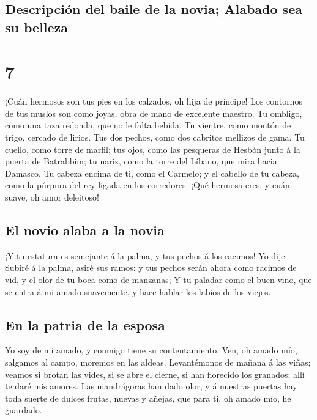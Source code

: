 \hypertarget{descripciuxf3n-del-baile-de-la-novia-alabado-sea-su-belleza}{%
\subsection{Descripción del baile de la novia; Alabado sea su
belleza}\label{descripciuxf3n-del-baile-de-la-novia-alabado-sea-su-belleza}}

\hypertarget{section-22-7}{%
\section{7}\label{section-22-7}}

 ¡Cuán hermosos son tus pies en los calzados, oh hija de
príncipe! Los contornos de tus muslos son como joyas, obra de mano de
excelente maestro.  Tu ombligo, como una taza redonda, que
no le falta bebida. Tu vientre, como montón de trigo, cercado de lirios.
 Tus dos pechos, como dos cabritos mellizos de gama.
 Tu cuello, como torre de marfil; tus ojos, como las
pesqueras de Hesbón junto á la puerta de Batrabbim; tu nariz, como la
torre del Líbano, que mira hacia Damasco.  Tu cabeza
encima de ti, como el Carmelo; y el cabello de tu cabeza, como la
púrpura del rey ligada en los corredores.  ¡Qué hermosa
eres, y cuán suave, oh amor deleitoso!

\hypertarget{el-novio-alaba-a-la-novia}{%
\subsection{El novio alaba a la novia}\label{el-novio-alaba-a-la-novia}}

 ¡Y tu estatura es semejante á la palma, y tus pechos á
los racimos!  Yo dije: Subiré á la palma, asiré sus ramos:
y tus pechos serán ahora como racimos de vid, y el olor de tu boca como
de manzanas;  Y tu paladar como el buen vino, que se entra
á mi amado suavemente, y hace hablar los labios de los viejos.

\hypertarget{en-la-patria-de-la-esposa}{%
\subsection{En la patria de la esposa}\label{en-la-patria-de-la-esposa}}

 Yo soy de mi amado, y conmigo tiene su contentamiento.
 Ven, oh amado mío, salgamos al campo, moremos en las
aldeas.  Levantémonos de mañana á las viñas; veamos si
brotan las vides, si se abre el cierne, si han florecido los granados;
allí te daré mis amores.  Las mandrágoras han dado olor,
y á nuestras puertas hay toda suerte de dulces frutas, nuevas y añejas,
que para ti, oh amado mío, he guardado.

